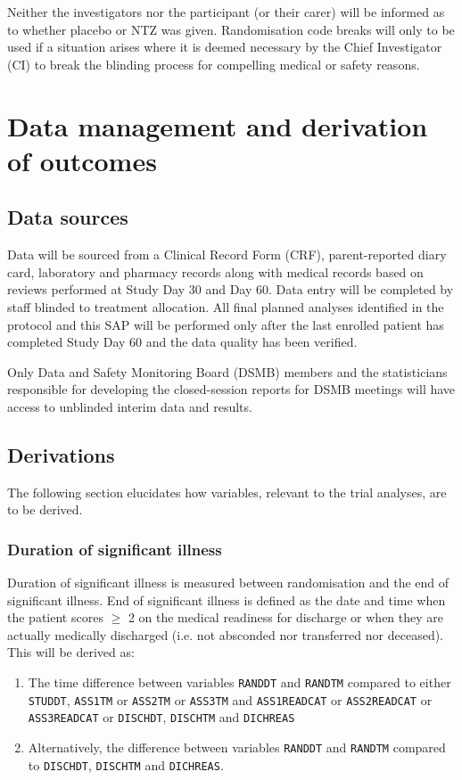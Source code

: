 \documentclass[a4paper]{article}
\begin{document}
Neither the investigators nor the participant (or their carer) will be informed as to whether placebo or NTZ was given.
Randomisation code breaks will only to be used if a situation arises where it is deemed necessary by the Chief Investigator (CI) to break the blinding process for compelling medical or safety reasons. 

\section{Data management and derivation of outcomes}

\subsection{Data sources}

Data will be sourced from a Clinical Record Form (CRF), parent-reported diary card, laboratory and pharmacy records along with medical records based on reviews performed at Study Day 30 and Day 60.
Data entry will be completed by staff blinded to treatment allocation.
All final planned analyses identified in the protocol and this SAP will be performed only after the last enrolled patient has completed Study Day 60 and the data quality has been verified.

Only Data and Safety Monitoring Board (DSMB) members and the statisticians responsible for developing the  closed-session reports for DSMB meetings will have access to unblinded interim data and results.

\subsection{Derivations}

The following section elucidates how variables, relevant to the trial analyses, are to be derived.

\subsubsection{Duration of significant illness}

Duration of significant illness is measured between randomisation and the end of significant illness.
End of significant illness is defined as the date and time when the patient scores $\ge$ 2 on the medical readiness for discharge or when they are actually medically discharged (i.e. not absconded nor transferred nor deceased).
This will be derived as:

\begin{enumerate}
    \item The time difference between variables \texttt{RANDDT} and \texttt{RANDTM} compared to either \texttt{STUDDT}, \texttt{ASS1TM} or \texttt{ASS2TM} or \texttt{ASS3TM} and \texttt{ASS1READCAT} or \texttt{ASS2READCAT} or \texttt{ASS3READCAT} or \texttt{DISCHDT}, \texttt{DISCHTM} and \texttt{DICHREAS}
    \item Alternatively, the difference between variables \texttt{RANDDT} and \texttt{RANDTM} compared to \texttt{DISCHDT}, \texttt{DISCHTM} and \texttt{DICHREAS}.
\end{enumerate}
\end{document}
